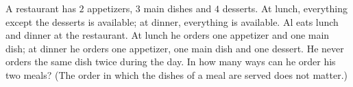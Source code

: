 A restaurant has $2$ appetizers, $3$ main dishes and $4$ desserts. At lunch, everything except the desserts is available; at dinner, everything is available. Al eats lunch and dinner at the restaurant. At lunch he orders one appetizer and one main dish; at dinner he orders one appetizer, one main dish and one dessert. He never orders the same dish twice during the day. In how many ways can he order his two meals? (The order in which the dishes of a meal are served does not matter.)

